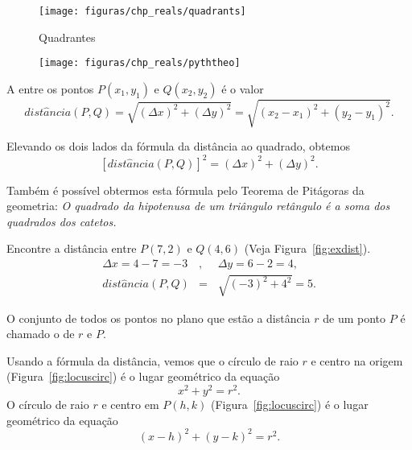 \documentclass{svmono}
\begin{document}
\begin{figure}
\begin{minipage}[b]{1.854in}
\texttt{[image: figuras/chp\_reals/quadrants]}
\caption{Quadrantes}
\label{fig:quadrants}
\end{minipage}%
\hfill%
\begin{minipage}[b]{2.514in}
\texttt{[image: figuras/chp\_reals/pyththeo]}
\caption{}
\label{fig:pyththeo}
\end{minipage}
\end{figure}

\begin{defin}
A  entre os pontos $P(x_1,y_1)$ e $Q(x_2,y_2)$ é
o valor
\[
  dist\hat{a}ncia(P,Q) = \sqrt{(\Delta x)^2 + (\Delta y)^2}
                       = \sqrt{(x_2 - x_1)^2 + (y_2 - y_1)^2}.
\]
\end{defin}

Elevando os dois lados da fórmula da distância ao quadrado, obtemos
\[
  [dist\hat{a}ncia(P,Q)]^2 = (\Delta x)^2 + (\Delta y)^2.
\]

Também é possível obtermos esta fórmula pelo Teorema de Pitágoras
da geometria: \emph{O quadrado da hipotenusa de um triângulo
retângulo é a soma dos quadrados dos catetos.}

\begin{example}
\label{ex:distance}
Encontre a distância entre $P(7,2)$ e $Q(4,6)$
(Veja Figura~\ref{fig:exdist}).
\begin{eqnarray*}
\Delta x = 4 - 7 = -3 &,\phantom{,} & \Delta y = 6 - 2 = 4, \\
 dist\hat{a}ncia(P,Q) & =           & \sqrt{(-3)^2 + 4^2} = 5.
\end{eqnarray*}
\end{example}


\begin{defin}[círculo]
O conjunto de todos os pontos no plano que estão a distância $r$ de um ponto
$P$ é chamado o  de  $r$ e  $P$.
\end{defin}

Usando a fórmula da distância, vemos que o círculo de raio $r$ e centro na
origem (Figura~\ref{fig:locuscirc}) é o lugar geométrico da equação
\[
	x^2 + y^2 = r^2.
\]
O círculo de raio $r$ e centro em $P(h,k)$ (Figura~\ref{fig:locuscirc}) é
o lugar geométrico da equação
\[
	(x-h)^2 + (y-k)^2 = r^2.
\]

\end{document}

